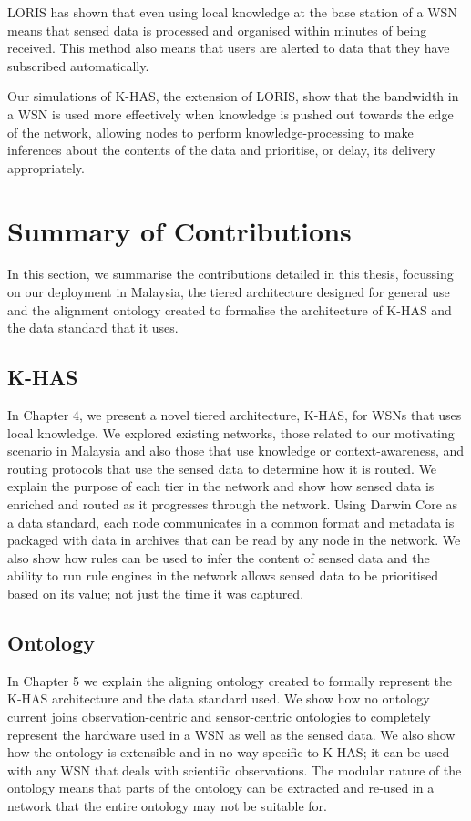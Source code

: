 LORIS has shown that even using local knowledge at the base station of a WSN means that sensed data is processed and organised within minutes of being received. This method also means that users are alerted to data that they have subscribed automatically.

Our simulations of K-HAS, the extension of LORIS, show that the bandwidth in a WSN is used more effectively when knowledge is pushed out towards the edge of the network, allowing nodes to perform knowledge-processing to make inferences about the contents of the data and prioritise, or delay, its delivery appropriately.


\section{Summary of Contributions}
In this section, we summarise the contributions detailed in this thesis, focussing on our deployment in Malaysia, the tiered architecture designed for general use and the alignment ontology created to formalise the architecture of K-HAS and the data standard that it uses. 
\subsection{K-HAS}
In Chapter 4, we present a novel tiered architecture, K-HAS, for WSNs that uses local knowledge. We explored existing networks, those related to our motivating scenario in Malaysia and also those that use knowledge or context-awareness, and routing protocols that use the sensed data to determine how it is routed. We explain the purpose of each tier in the network and show how sensed data is enriched and routed as it progresses through the network. Using Darwin Core as a data standard, each node communicates in a common format and metadata is packaged with data in archives that can be read by any node in the network. We also show how rules can be used to infer the content of sensed data and the ability to run rule engines in the network allows sensed data to be prioritised based on its value; not just the time it was captured.
\subsection{Ontology}
In Chapter 5 we explain the aligning ontology created to formally represent the K-HAS architecture and the data standard used. We show how no ontology current joins observation-centric and sensor-centric ontologies to completely represent the hardware used in a WSN as well as the sensed data. We also show how the ontology is extensible and in no way specific to K-HAS; it can be used with any WSN that deals with scientific observations. The modular nature of the ontology means that parts of the ontology can be extracted and re-used in a network that the entire ontology may not be suitable for.
